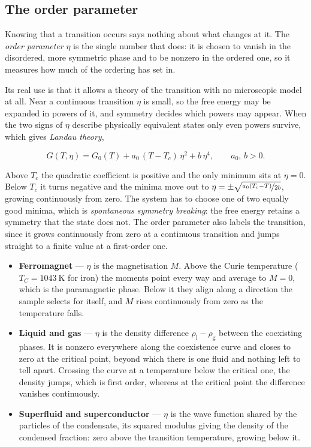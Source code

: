     \subsection{The order parameter}

        Knowing that a transition occurs says nothing about what changes at it. The \emph{order parameter} $\eta$ is the single number that does: it is chosen to vanish in the disordered, more symmetric phase and to be nonzero in the ordered one, so it measures how much of the ordering has set in.

        Its real use is that it allows a theory of the transition with no microscopic model at all. Near a continuous transition $\eta$ is small, so the free energy may be expanded in powers of it, and symmetry decides which powers may appear. When the two signs of $\eta$ describe physically equivalent states only even powers survive, which gives \emph{Landau theory},

        \begin{equation}\label{eq:landau}
            G(T,\eta) = G_0(T) + a_0\,(T - T_c)\,\eta^{2} + b\,\eta^{4}, \qquad a_0,\,b > 0 .
        \end{equation}

        Above $T_c$ the quadratic coefficient is positive and the only minimum sits at $\eta = 0$. Below $T_c$ it turns negative and the minima move out to $\eta = \pm\sqrt{\nicefrac{a_0(T_c - T)}{2b}}$, growing continuously from zero. The system has to choose one of two equally good minima, which is \emph{spontaneous symmetry breaking}: the free energy retains a symmetry that the state does not. The order parameter also labels the transition, since it grows continuously from zero at a continuous transition and jumps straight to a finite value at a first-order one.

        \begin{itemize}
            \item \textbf{Ferromagnet} --- $\eta$ is the magnetisation $M$. Above the Curie temperature ($T_C = \qty{1043}{\kelvin}$ for iron) the moments point every way and average to $M = 0$, which is the paramagnetic phase. Below it they align along a direction the sample selects for itself, and $M$ rises continuously from zero as the temperature falls.
            \item \textbf{Liquid and gas} --- $\eta$ is the density difference $\rho_{\mathrm{l}} - \rho_{\mathrm{g}}$ between the coexisting phases. It is nonzero everywhere along the coexistence curve and closes to zero at the critical point, beyond which there is one fluid and nothing left to tell apart. Crossing the curve at a temperature below the critical one, the density jumps, which is first order, whereas at the critical point the difference vanishes continuously.
            \item \textbf{Superfluid and superconductor} --- $\eta$ is the wave function shared by the particles of the condensate, its squared modulus giving the density of the condensed fraction: zero above the transition temperature, growing below it.
        \end{itemize}

